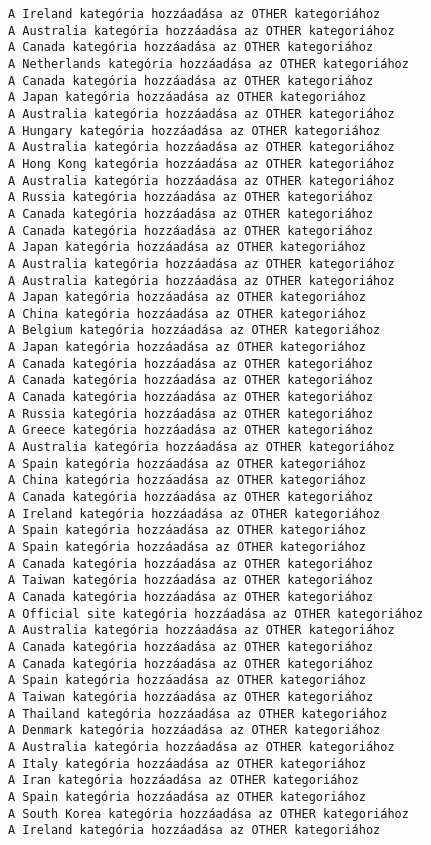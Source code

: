 \documentclass[11pt]{article}
\begin{document}
\begin{Verbatim}[commandchars=\\\{\}]
A Ireland kategória hozzáadása az OTHER kategoriához
A Australia kategória hozzáadása az OTHER kategoriához
A Canada kategória hozzáadása az OTHER kategoriához
A Netherlands kategória hozzáadása az OTHER kategoriához
A Canada kategória hozzáadása az OTHER kategoriához
A Japan kategória hozzáadása az OTHER kategoriához
A Australia kategória hozzáadása az OTHER kategoriához
A Hungary kategória hozzáadása az OTHER kategoriához
A Australia kategória hozzáadása az OTHER kategoriához
A Hong Kong kategória hozzáadása az OTHER kategoriához
A Australia kategória hozzáadása az OTHER kategoriához
A Russia kategória hozzáadása az OTHER kategoriához
A Canada kategória hozzáadása az OTHER kategoriához
A Canada kategória hozzáadása az OTHER kategoriához
A Japan kategória hozzáadása az OTHER kategoriához
A Australia kategória hozzáadása az OTHER kategoriához
A Australia kategória hozzáadása az OTHER kategoriához
A Japan kategória hozzáadása az OTHER kategoriához
A China kategória hozzáadása az OTHER kategoriához
A Belgium kategória hozzáadása az OTHER kategoriához
A Japan kategória hozzáadása az OTHER kategoriához
A Canada kategória hozzáadása az OTHER kategoriához
A Canada kategória hozzáadása az OTHER kategoriához
A Canada kategória hozzáadása az OTHER kategoriához
A Russia kategória hozzáadása az OTHER kategoriához
A Greece kategória hozzáadása az OTHER kategoriához
A Australia kategória hozzáadása az OTHER kategoriához
A Spain kategória hozzáadása az OTHER kategoriához
A China kategória hozzáadása az OTHER kategoriához
A Canada kategória hozzáadása az OTHER kategoriához
A Ireland kategória hozzáadása az OTHER kategoriához
A Spain kategória hozzáadása az OTHER kategoriához
A Spain kategória hozzáadása az OTHER kategoriához
A Canada kategória hozzáadása az OTHER kategoriához
A Taiwan kategória hozzáadása az OTHER kategoriához
A Canada kategória hozzáadása az OTHER kategoriához
A Official site kategória hozzáadása az OTHER kategoriához
A Australia kategória hozzáadása az OTHER kategoriához
A Canada kategória hozzáadása az OTHER kategoriához
A Canada kategória hozzáadása az OTHER kategoriához
A Spain kategória hozzáadása az OTHER kategoriához
A Taiwan kategória hozzáadása az OTHER kategoriához
A Thailand kategória hozzáadása az OTHER kategoriához
A Denmark kategória hozzáadása az OTHER kategoriához
A Australia kategória hozzáadása az OTHER kategoriához
A Italy kategória hozzáadása az OTHER kategoriához
A Iran kategória hozzáadása az OTHER kategoriához
A Spain kategória hozzáadása az OTHER kategoriához
A South Korea kategória hozzáadása az OTHER kategoriához
A Ireland kategória hozzáadása az OTHER kategoriához

\end{Verbatim}
\end{document}
